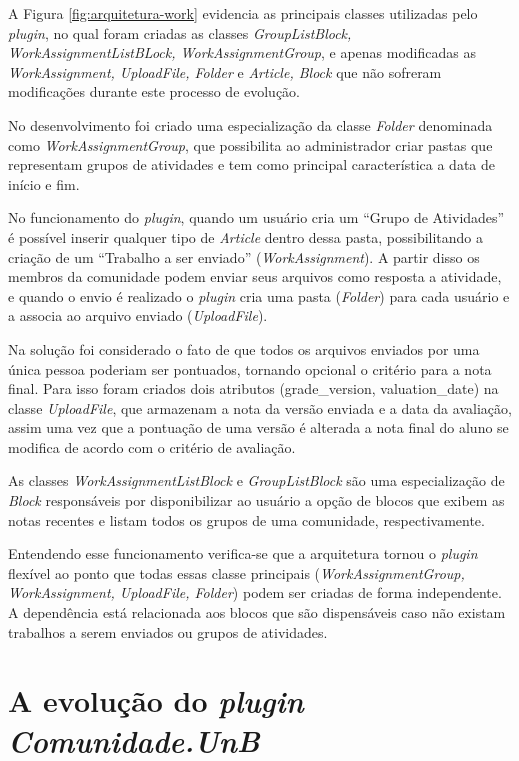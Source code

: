 A Figura \ref{fig:arquitetura-work} evidencia as principais classes utilizadas pelo \textit{plugin}, no qual foram criadas as classes \textit{GroupListBlock, WorkAssignmentListBLock, WorkAssignmentGroup}, e apenas modificadas as \textit{WorkAssignment, UploadFile, Folder} e \textit{Article, Block} que não sofreram modificações durante este processo de evolução.

No desenvolvimento foi criado uma especialização da classe \textit{Folder} denominada como \textit{WorkAssignmentGroup}, que possibilita ao administrador criar pastas que representam grupos de atividades e tem como principal característica a data de início e fim.

No funcionamento do \textit{plugin}, quando um usuário cria um ``Grupo de Atividades'' é possível inserir qualquer tipo de \textit{Article} dentro dessa pasta, possibilitando a criação de um ``Trabalho a ser enviado'' (\textit{WorkAssignment}). A partir disso os membros da comunidade podem enviar seus arquivos como resposta a atividade, e quando o envio é realizado o \textit{plugin} cria uma pasta (\textit{Folder}) para cada usuário e a associa ao arquivo enviado (\textit{UploadFile}). 

Na solução foi considerado o fato de que todos os arquivos enviados por uma única pessoa poderiam ser pontuados, tornando opcional o critério para a nota final. Para isso foram criados dois atributos (grade\_version, valuation\_date) na classe \textit{UploadFile}, que armazenam a nota da versão enviada e a data da avaliação, assim uma vez que a pontuação de uma versão é alterada a nota final do aluno se modifica de acordo com o critério de avaliação.

As classes \textit{WorkAssignmentListBlock} e \textit{GroupListBlock} são uma especialização de \textit{Block} responsáveis por disponibilizar ao usuário a opção de blocos que exibem as notas recentes e listam todos os grupos de uma comunidade, respectivamente.

Entendendo esse funcionamento verifica-se que a arquitetura tornou o \textit{plugin} flexível ao ponto que todas essas classe principais (\textit{WorkAssignmentGroup, WorkAssignment, UploadFile, Folder}) podem ser criadas de forma independente. A dependência está relacionada aos blocos que são dispensáveis caso não existam trabalhos a serem enviados ou grupos de atividades.

\section{A evolução do \textit{plugin Comunidade.UnB}}
\label{plugin-comunidade}

